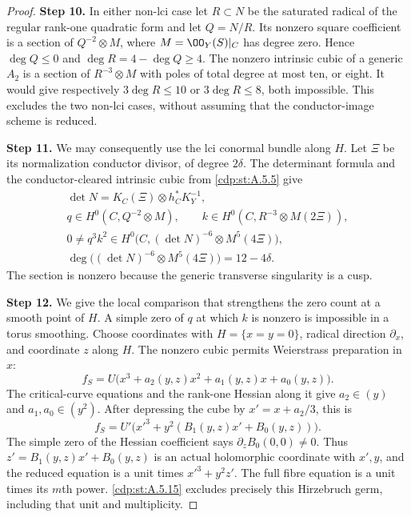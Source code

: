 \begin{proof}
\noindent\textbf{Step 10.} In either non-lci case let $R\subset N$ be the saturated
radical of the regular rank-one quadratic form and let
$Q=N/R$. Its nonzero square coefficient is a section of
$Q^{-2}\otimes M$, where $M=\OO_Y(S)|_C$ has degree
zero. Hence $\deg Q\le0$ and $\deg R=4-\deg Q\ge4$.
The nonzero intrinsic cubic of a generic $A_2$ is a
section of $R^{-3}\otimes M$ with poles of total degree
at most ten, or eight. It would give respectively
$3\deg R\le10$ or $3\deg R\le8$, both impossible.
This excludes the two non-lci cases, without assuming
that the conductor-image scheme is reduced.

\noindent\textbf{Step 11.} We may consequently use the lci conormal bundle along $H$.
Let $\Xi$ be its normalization conductor divisor, of degree
$2\delta$. The determinant formula and the
conductor-cleared intrinsic cubic from \ref{cdp:st:A.5.5} give
\[
\begin{gathered}
 \det N=K_C(\Xi)\otimes h_C^*K_Y^{-1},\\
 q\in H^0(C,Q^{-2}\otimes M),\qquad
 k\in H^0(C,R^{-3}\otimes M(2\Xi)),\\
 0\ne q^3k^2\in
 H^0\bigl(C,(\det N)^{-6}\otimes M^5(4\Xi)\bigr),\\
 \deg\bigl((\det N)^{-6}\otimes M^5(4\Xi)\bigr)
                         =12-4\delta .
\end{gathered}                                  \tag{C.RA.13}\label{cdp:eq:C.RA.13}
\]
The section is nonzero because the generic transverse
singularity is a cusp.

\noindent\textbf{Step 12.} We give the local comparison that strengthens the zero
count at a smooth point of $H$. A simple zero of $q$ at
which $k$ is nonzero is impossible in a torus smoothing.
Choose coordinates with $H=\{x=y=0\}$, radical direction
$\partial_x$, and coordinate $z$ along $H$.
The nonzero cubic permits Weierstrass preparation in $x$:
\[
 f_S=U\bigl(x^3+a_2(y,z)x^2+a_1(y,z)x+a_0(y,z)\bigr).
 \tag{C.RA.14}\label{cdp:eq:C.RA.14}
\]
The critical-curve equations and the rank-one Hessian
along it give $a_2\in(y)$ and $a_1,a_0\in(y^2)$.
After depressing the cube by $x'=x+a_2/3$, this is
\[
 f_S=U'\bigl(x'^3+y^2(B_1(y,z)x'+B_0(y,z))\bigr).
 \tag{C.RA.15}\label{cdp:eq:C.RA.15}
\]
The simple zero of the Hessian coefficient says
$\partial_zB_0(0,0)\ne0$. Thus
$z'=B_1(y,z)x'+B_0(y,z)$ is an actual holomorphic
coordinate with $x',y$, and the reduced equation is a
unit times $x'^3+y^2z'$. The full fibre equation is a
unit times its $m$th power. \ref{cdp:st:A.5.15} excludes precisely
this Hirzebruch germ, including that unit and multiplicity.


\end{proof}
